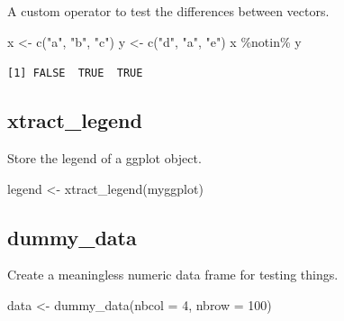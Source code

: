 \documentclass[
  12pt,
  american,
  a4paper,
  extrafontsizes,onecolumn,openright
  ]{memoir}
\newenvironment{Shaded}{\begin{snugshade}}{\end{snugshade}}
\newcommand{\AttributeTok}[1]{\textcolor[rgb]{0.77,0.63,0.00}{#1}}
\newcommand{\DecValTok}[1]{\textcolor[rgb]{0.00,0.00,0.81}{#1}}
\newcommand{\FunctionTok}[1]{\textcolor[rgb]{0.00,0.00,0.00}{#1}}
\newcommand{\NormalTok}[1]{#1}
\newcommand{\OtherTok}[1]{\textcolor[rgb]{0.56,0.35,0.01}{#1}}
\newcommand{\SpecialCharTok}[1]{\textcolor[rgb]{0.00,0.00,0.00}{#1}}
\newcommand{\StringTok}[1]{\textcolor[rgb]{0.31,0.60,0.02}{#1}}
\begin{document}
A custom operator to test the differences between vectors.

\scriptsize

\begin{Shaded}
\begin{Highlighting}[]
\NormalTok{x }\OtherTok{\textless{}{-}} \FunctionTok{c}\NormalTok{(}\StringTok{"a"}\NormalTok{, }\StringTok{"b"}\NormalTok{, }\StringTok{"c"}\NormalTok{)}
\NormalTok{y }\OtherTok{\textless{}{-}} \FunctionTok{c}\NormalTok{(}\StringTok{"d"}\NormalTok{, }\StringTok{"a"}\NormalTok{, }\StringTok{"e"}\NormalTok{)}
\NormalTok{x }\SpecialCharTok{\%notin\%}\NormalTok{ y}
\end{Highlighting}
\end{Shaded}

\normalsize

\texttt{{[}1{]}\ FALSE\ \ TRUE\ \ TRUE}

\hypertarget{xtract_legend}{%
\subsection{xtract\_legend}\label{xtract_legend}}

Store the legend of a ggplot object.

\scriptsize

\begin{Shaded}
\begin{Highlighting}[]
\NormalTok{legend }\OtherTok{\textless{}{-}} \FunctionTok{xtract\_legend}\NormalTok{(myggplot)}
\end{Highlighting}
\end{Shaded}

\normalsize

\hypertarget{dummy_data}{%
\subsection{dummy\_data}\label{dummy_data}}

Create a meaningless numeric data frame for testing things.

\scriptsize

\begin{Shaded}
\begin{Highlighting}[]
\NormalTok{data }\OtherTok{\textless{}{-}} \FunctionTok{dummy\_data}\NormalTok{(}\AttributeTok{nbcol =} \DecValTok{4}\NormalTok{, }\AttributeTok{nbrow =} \DecValTok{100}\NormalTok{)}
\end{Highlighting}
\end{Shaded}
\end{document}
